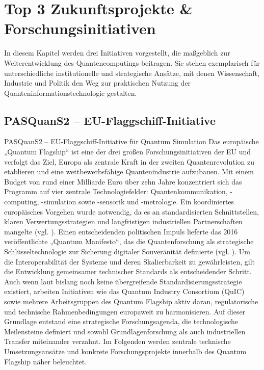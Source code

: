 \section{Top 3 Zukunftsprojekte \& Forschungsinitiativen}
\label{Chemie_Projekte}

In diesem Kapitel werden drei Initiativen vorgestellt, die maßgeblich zur Weiterentwicklung des Quantencomputings beitragen. Sie stehen exemplarisch für unterschiedliche institutionelle und strategische Ansätze, mit denen Wissenschaft, Industrie und Politik den Weg zur praktischen Nutzung der Quanteninformationstechnologie gestalten. 

\subsection*{PASQuanS2 – EU-Flaggschiff-Initiative}
\label{Chemie_Projekte_PASQuanS2}

PASQuanS2 – EU-Flaggschiff-Initiative für Quantum Simulation
Das europäische „Quantum Flagship“ ist eine der drei großen Forschungsinitiativen der EU und verfolgt das Ziel, Europa als zentrale Kraft in der zweiten Quantenrevolution zu etablieren und eine wettbewerbsfähige Quantenindustrie aufzubauen. Mit einem Budget von rund einer Milliarde Euro über zehn Jahre konzentriert sich das Programm auf vier zentrale Technologiefelder: Quantenkommunikation, -computing, -simulation sowie -sensorik und -metrologie. Ein koordiniertes europäisches Vorgehen wurde notwendig, da es an standardisierten Schnittstellen, klaren Verwertungsstrategien und langfristigen industriellen Partnerschaften mangelte (vgl. \cite{rasanenPathEuropeanQuantum2021}). Einen entscheidenden politischen Impuls lieferte das 2016 veröffentlichte „Quantum Manifesto“, das die Quantenforschung als strategische Schlüsseltechnologie zur Sicherung digitaler Souveränität definierte (vgl. \cite{vandeventerEuropeanStandardsQuantum2022}). Um die Interoperabilität der Systeme und deren Skalierbarkeit zu gewährleisten, gilt die Entwicklung gemeinsamer technischer Standards als entscheidender Schritt. Auch wenn laut \cite{vandeventerEuropeanStandardsQuantum2022} bislang noch keine übergreifende Standardisierungsstrategie existiert, arbeiten Initiativen wie das Quantum Industry Consortium (QuIC) sowie mehrere Arbeitsgruppen des Quantum Flagship aktiv daran, regulatorische und technische Rahmenbedingungen europaweit zu harmonisieren. Auf dieser Grundlage entstand eine strategische Forschungsagenda, die technologische Meilensteine definiert und sowohl Grundlagenforschung als auch industriellen Transfer miteinander verzahnt. Im Folgenden werden zentrale technische Umsetzungsansätze und konkrete Forschungsprojekte innerhalb des Quantum Flagship näher beleuchtet.

